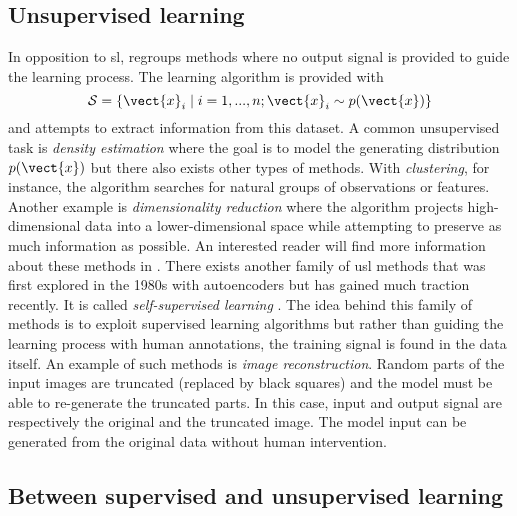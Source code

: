 \subsection{Unsupervised learning}
\label{ssec:backml:usl}

In opposition to \acrlong{sl},  regroups methods where no output signal is provided to guide the learning process. The learning algorithm is provided with 
\begin{equation}
\mathcal{S} = \left\{\vect{x}_i \mid i = 1,..., n ; \vect{x}_i \sim p(\vect{x})\right\}
\end{equation} 
and attempts to extract information from this dataset. A common unsupervised task is \textit{density estimation} where the goal is to model the generating distribution $p(\vect{x})$ but there also exists other types of methods. With \textit{clustering}, for instance, the algorithm searches for natural groups of observations or features. Another example is \textit{dimensionality reduction} where the algorithm projects high-dimensional data into a lower-dimensional space while attempting to preserve as much information as possible. An interested reader will find more information about these methods in \parencite{friedman2017elements}. There exists another family of \acrlong{usl} methods that was first explored in the 1980s with autoencoders but has gained much traction recently. It is called \textit{self-supervised learning} \parencite{lecun2021self}. The idea behind this family of methods is to exploit supervised learning algorithms but rather than guiding the learning process with human annotations, the training signal is found in the data itself. An example of such methods is \textit{image reconstruction}. Random parts of the input images are truncated (\eg replaced by black squares) and the model must be able to re-generate the truncated parts. In this case, input and output signal are respectively the original and the truncated image. The model input can be generated from the original data without human intervention. 

\subsection{Between supervised and unsupervised learning}
\label{ssec:backml:inbetween}

